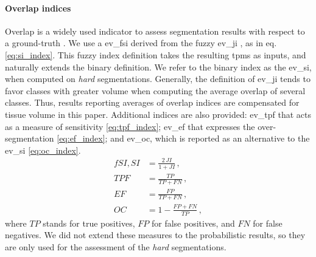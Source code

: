 \paragraph{Overlap indices\label{sec:evaluation_indices}}
Overlap is a widely used indicator to assess segmentation results
  with respect to a ground-truth \citep{crum_generalized_2006}.
We use a \gls*{ev_fsi} derived from the fuzzy \gls*{ev_ji} \citep{crum_generalized_2006},
  as in eq. \eqref{eq:si_index}.
This fuzzy index definition takes the resulting \glspl*{tpm} as inputs,
  and naturally extends the binary definition.
We refer to the binary index as the \gls*{ev_si}, when computed on
  \emph{hard} segmentations.
Generally, the definition of \gls*{ev_ji} tends to favor classes with greater volume
  when computing the average overlap of several classes.
Thus, results reporting averages of overlap indices are compensated
  for tissue volume in this paper.
Additional indices are also provided:
  \gls*{ev_tpf} that acts as a measure of sensitivity \eqref{eq:tpf_index};
  \gls*{ev_ef} that expresses the over-segmentation \eqref{eq:ef_index};
  and \gls*{ev_oc}, which is reported as an alternative to the 
  \gls*{ev_si} \eqref{eq:oc_index}.
\begin{align}
fSI,SI&=\frac{2\,JI}{1+JI}\,, \label{eq:si_index} \\
TPF&=\frac{TP}{TP+FN}\,, \label{eq:tpf_index} \\
EF&=\frac{FP}{TP+FN}\,, \label{eq:ef_index} \\
OC&=1-\frac{FP+FN}{TP}\,, \label{eq:oc_index}
\end{align}
where $TP$ stands for true positives, $FP$ for false positives, and $FN$ for false 
negatives. We did not extend these measures to the probabilistic results, so they
are only used for the assessment of the \emph{hard} segmentations.
